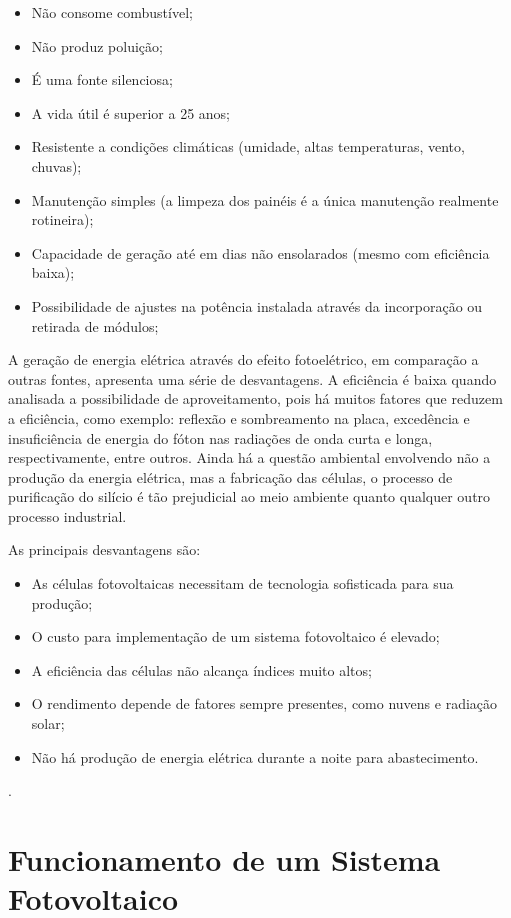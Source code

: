 \begin{itemize}
	\item Não consome combustível;
	\item Não produz poluição;
	\item É uma fonte silenciosa;
	\item A vida útil é superior a 25 anos;
	\item Resistente a condições climáticas (umidade, altas temperaturas, vento, chuvas);
	\item Manutenção simples (a limpeza dos painéis é a única manutenção realmente rotineira);
	\item Capacidade de geração até em dias não ensolarados (mesmo com eficiência baixa);
	\item Possibilidade de ajustes na potência instalada através da incorporação ou retirada de módulos;
\end{itemize}

A geração de energia elétrica através do efeito fotoelétrico, em comparação a outras fontes, apresenta uma série de desvantagens. A eficiência é baixa quando analisada a possibilidade de aproveitamento, pois há muitos fatores que reduzem a eficiência, como exemplo: reflexão e sombreamento na placa, excedência e insuficiência de energia do fóton nas radiações de onda curta e longa, respectivamente, entre outros. Ainda há a questão ambiental envolvendo não a produção da energia elétrica, mas a fabricação das células, o processo de purificação do silício é tão prejudicial ao meio ambiente quanto qualquer outro processo industrial.

As principais desvantagens são:

\begin{itemize}
	\item As células fotovoltaicas necessitam de tecnologia sofisticada para sua produção;
	\item O custo para implementação de um sistema fotovoltaico é elevado;
	\item A eficiência das células não alcança índices muito altos;
	\item O rendimento depende de fatores sempre presentes, como nuvens e radiação solar;
	\item Não há produção de energia elétrica durante a noite para abastecimento.

\end{itemize}

\cite{braga2008energia}.

\section{Funcionamento de um Sistema Fotovoltaico}

